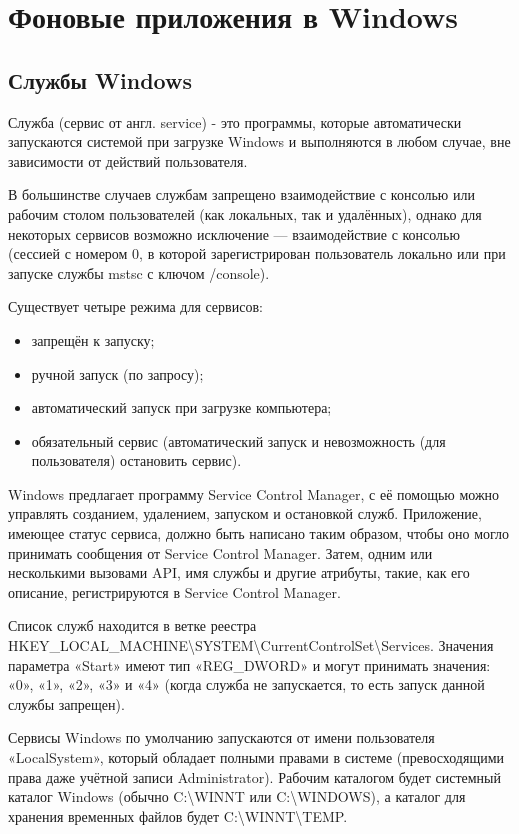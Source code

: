 \newpage
\section{Фоновые приложения в Windows}

\subsection{Службы Windows}

Служба (сервис от англ. service) - это программы, которые автоматически запускаются системой при загрузке Windows и выполняются в любом случае, вне зависимости от действий пользователя.

В большинстве случаев службам запрещено взаимодействие с консолью или рабочим столом пользователей (как локальных, так и удалённых), однако для некоторых сервисов возможно исключение — взаимодействие с консолью (сессией с номером 0, в которой зарегистрирован пользователь локально или при запуске службы mstsc с ключом /console).

Существует четыре режима для сервисов:
\begin{itemize}
\item запрещён к запуску;
\item ручной запуск (по запросу);
\item автоматический запуск при загрузке компьютера;
\item обязательный сервис (автоматический запуск и невозможность (для пользователя) остановить сервис).
\end{itemize}

Windows предлагает программу Service Control Manager, с её помощью можно управлять созданием, удалением, запуском и остановкой служб. Приложение, имеющее статус сервиса, должно быть написано таким образом, чтобы оно могло принимать сообщения от Service Control Manager. Затем, одним или несколькими вызовами API, имя службы и другие атрибуты, такие, как его описание, регистрируются в Service Control Manager.

Список служб находится в ветке реестра HKEY\_LOCAL\_MACHINE\textbackslash SYSTEM\textbackslash CurrentControlSet\textbackslash Services. Значения параметра «Start» имеют тип «REG\_DWORD» и могут принимать значения: «0», «1», «2», «3» и «4» (когда служба не запускается, то есть запуск данной службы запрещен)\cite{Cit5}.

Сервисы Windows по умолчанию запускаются от имени пользователя «LocalSystem», который обладает полными правами в системе (превосходящими права даже учётной записи Administrator). Рабочим каталогом будет системный каталог Windows (обычно C:\textbackslash WINNT или C:\textbackslash WINDOWS), а каталог для хранения временных файлов будет C:\textbackslash WINNT\textbackslash TEMP.

